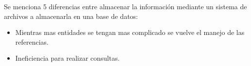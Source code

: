 \documentclass[10pt]{article}
\begin{document}
    
    
    \noindent Se menciona 5 diferencias entre almacenar la información mediante un sistema de archivos a almacenarla en una base de datos:
    
    \begin{itemize}
    	
    	\item Mientras mas entidades se tengan mas complicado se vuelve el manejo de las referencias.
    	\item Ineficiencia para realizar consultas.
    \end{itemize}
    
\end{document}
